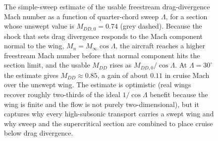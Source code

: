 \begin{figure}[htbp]
\centering
{}
\caption[Sweep raises the drag-divergence Mach number]{The simple-sweep
estimate of the usable freestream drag-divergence Mach number as a
function of quarter-chord sweep $\Lambda$, for a section whose unswept
value is $M_{DD,0}=0.74$ (grey dashed). Because the shock that sets drag
divergence responds to the Mach component normal to the wing,
$M_n=M_\infty\cos\Lambda$, the aircraft reaches a higher freestream Mach
number before that normal component hits the section limit, and the
usable $M_{DD}$ rises as $M_{DD,0}/\cos\Lambda$. At $\Lambda=30^{\circ}$
the estimate gives $M_{DD}\approx 0.85$, a gain of about $0.11$ in
cruise Mach over the unswept wing. The estimate is optimistic (real
wings recover roughly two-thirds of the ideal $1/\cos\Lambda$ benefit
because the wing is finite and the flow is not purely two-dimensional),
but it captures why every high-subsonic transport carries a swept wing
and why sweep and the supercritical section are combined to place cruise
below drag divergence.}
\label{fig:vol03ch13:swept-wing}
\end{figure}
